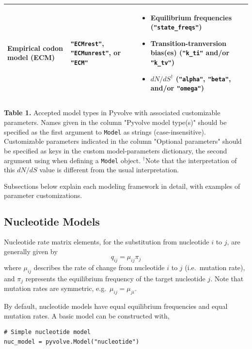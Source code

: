 \documentclass{article}
\newcommand{\code}[1]{\texttt{\small{#1}}}
\begin{document}
\begin{table}[H]
{{\begin{tabular}{>{\centering\arraybackslash}p{1.5in} >{\centering\arraybackslash}p{2in} >{\raggedright}p{4in}}
		Empirical codon model (ECM) & \code{"ECMrest"}, \code{"ECMunrest"}, or \code{"ECM"} & \vspace{-\topsep} \begin{itemize}[leftmargin=*]
																								\item Equilibrium frequencies (\code{"state\_freqs"})
																								\item Transition-tranversion bias(es) (\code{"k\_ti"} and/or \code{"k\_tv"})																																		\item $dN/dS^\dagger$ (\code{"alpha"}, \code{"beta"}, and/or \code{"omega"})
																									\end{itemize} \tabularnewline
	\hline

		\end{tabular}}}
\begin{flushleft}
\footnotesize{\textbf{Table 1.} Accepted model types in Pyvolve with associated customizable parameters. Names given in the column "Pyvolve model type(s)" should be specified as the first argument to \code{\footnotesize{Model}} as strings (case-insensitive). Customizable parameters indicated in the column "Optional parameters" should be specified as keys in the custom model-parameters dictionary, the second argument using when defining a \code{\footnotesize{Model}} object. \newline $^\dagger$Note that the interpretation of this $dN/dS$ value is different from the usual interpretation.}
\end{flushleft}
\end{table}

Subsections below explain each modeling framework in detail, with examples of parameter customizations.


\subsection{Nucleotide Models}\label{sec:nucleotide_basic}

Nucleotide rate matrix elements, for the substitution from nucleotide $i$ to $j$, are generally given by
\begin{equation}
q_{ij} = \mu_{ij} \pi_j
\end{equation}
where $\mu_{ij}$ describes the rate of change from nucleotide $i$ to $j$ (i.e.\ mutation rate), and $\pi_j$ represents the equilibrium frequency of the target nucleotide $j$. Note that mutation rates are symmetric, e.g.\ $\mu_{ij} = \mu_{ji}$.

By default, nucleotide models have equal equilibrium frequencies and equal mutation rates. A basic model can be constructed with,
\begin{lstlisting}
# Simple nucleotide model
nuc_model = pyvolve.Model("nucleotide")
\end{lstlisting}
\end{document}
